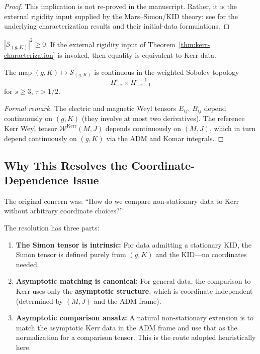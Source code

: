 \begin{proof}
This implication is not re-proved in the manuscript. Rather, it is the external rigidity input supplied by the Mars--Simon/KID theory; see \cite{mars1999, simon1984, backdahl2010a, backdahl2010b} for the underlying characterization results and their initial-data formulations.
\end{proof}

\begin{corollary}\label{cor:nonneg}
$|\mathcal{S}_{(g,K)}|^2 \geq 0$. If the external rigidity input of Theorem~\ref{thm:kerr-characterization} is invoked, then equality is equivalent to Kerr data.
\end{corollary}

\begin{remark}\label{thm:continuity}
The map $(g, K) \mapsto \mathcal{S}_{(g,K)}$ is continuous in the weighted Sobolev topology 
\[
H^s_{-\tau} \times H^{s-1}_{-\tau-1}
\]
for $s \geq 3$, $\tau > 1/2$.
\end{remark}

\begin{proof}[Formal remark]
The electric and magnetic Weyl tensors $E_{ij}$, $B_{ij}$ depend continuously on $(g, K)$ (they involve at most two derivatives). The reference Kerr Weyl tensor $\mathcal{W}^{\mathrm{Kerr}}(M, J)$ depends continuously on $(M, J)$, which in turn depend continuously on $(g, K)$ via the ADM and Komar integrals.
\end{proof}

\subsection{Why This Resolves the Coordinate-Dependence Issue}

The original concern was: ``How do we compare non-stationary data to Kerr without arbitrary coordinate choices?''

The resolution has three parts:
\begin{enumerate}
    \item \textbf{The Simon tensor is intrinsic:} For data admitting a stationary KID, the Simon tensor is defined purely from $(g, K)$ and the KID---no coordinates needed.
    
    \item \textbf{Asymptotic matching is canonical:} For general data, the comparison to Kerr uses only the \textbf{asymptotic structure}, which is coordinate-independent (determined by $(M, J)$ and the ADM frame).
    
    \item \textbf{Asymptotic comparison ansatz:} A natural non-stationary extension is to match the asymptotic Kerr data in the ADM frame and use that as the normalization for a comparison tensor. This is the route adopted heuristically here.
\end{enumerate}

